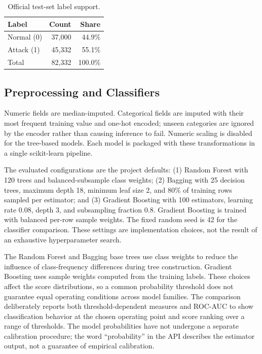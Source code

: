 \documentclass[conference]{IEEEtran}
\begin{document}
\begin{table}[t]
\caption{Official test-set label support.}
\label{tab:support}
\centering
\small
\begin{tabular}{lrr}
\toprule
Label & Count & Share \\
\midrule
Normal (0) & 37,000 & 44.9\% \\
Attack (1) & 45,332 & 55.1\% \\
Total & 82,332 & 100.0\% \\
\bottomrule
\end{tabular}
\end{table}

\subsection{Preprocessing and Classifiers}
Numeric fields are median-imputed. Categorical fields are imputed with their most frequent training value and one-hot encoded; unseen categories are ignored by the encoder rather than causing inference to fail. Numeric scaling is disabled for the tree-based models. Each model is packaged with these transformations in a single scikit-learn pipeline.

The evaluated configurations are the project defaults: (1) Random Forest with 120 trees and balanced-subsample class weights; (2) Bagging with 25 decision trees, maximum depth 18, minimum leaf size 2, and 80\% of training rows sampled per estimator; and (3) Gradient Boosting with 100 estimators, learning rate 0.08, depth 3, and subsampling fraction 0.8. Gradient Boosting is trained with balanced per-row sample weights. The fixed random seed is 42 for the classifier comparison. These settings are implementation choices, not the result of an exhaustive hyperparameter search.

The Random Forest and Bagging base trees use class weights to reduce the influence of class-frequency differences during tree construction. Gradient Boosting uses sample weights computed from the training labels. These choices affect the score distributions, so a common probability threshold does not guarantee equal operating conditions across model families. The comparison deliberately reports both threshold-dependent measures and ROC-AUC to show classification behavior at the chosen operating point and score ranking over a range of thresholds. The model probabilities have not undergone a separate calibration procedure; the word ``probability'' in the API describes the estimator output, not a guarantee of empirical calibration.
\end{document}
